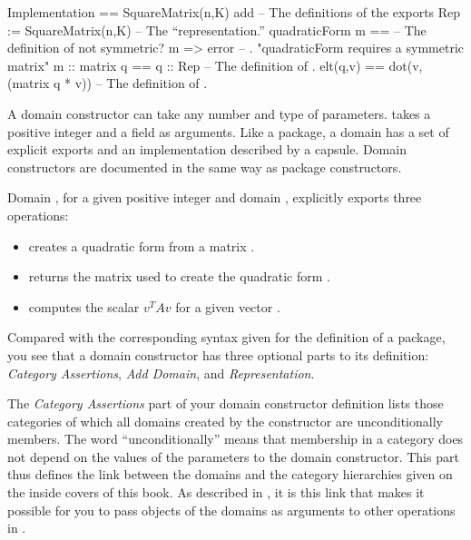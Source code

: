 {{{{\begin{figXmpLines}[caption={The \textspadtype{QuadraticForm} domain.},label={fig-quadform}]
    Implementation == SquareMatrix(n,K) add              -- The definitions of the exports
      Rep := SquareMatrix(n,K)                           -- The ``representation.''
      quadraticForm m ==                                 -- The definition of
        not symmetric? m => error                        -- .
          "quadraticForm requires a symmetric matrix"
        m :: %
      matrix q == q :: Rep                               -- The definition of .
      elt(q,v) == dot(v, (matrix q * v))                 -- The definition of .
\end{figXmpLines}

A domain constructor can take any number and type of parameters.
 takes a positive integer  and a field
 as arguments.
Like a package, a domain has a set of explicit exports and an
implementation described by a capsule.
Domain constructors are documented in the same way as package constructors.

Domain , for a given positive integer
 and domain , explicitly exports three operations:
%
\begin{itemize}
\item{} creates a quadratic form from a matrix
.
\item{} returns the matrix  used to create
the quadratic form .
\item{} computes the scalar $v^TAv$
for a given vector .
\end{itemize}

Compared with the corresponding syntax given for the definition of a
package, you see that a domain constructor has three optional parts to
its definition: {\it Category Assertions}, {\it Add Domain}, and
{\it Representation}.

%

The {\it Category Assertions} part of your domain constructor
definition lists those categories of which all domains created by
the constructor are unconditionally members.
The word ``unconditionally'' means that membership in a category
does not depend on the values of the parameters to the domain
constructor.
This part thus defines the link between the domains and the
category hierarchies given on the inside covers of this book.
As described in , it is this link
that makes it possible for you to pass objects of the domains as
arguments to other operations in \Language{}.

}}}}
